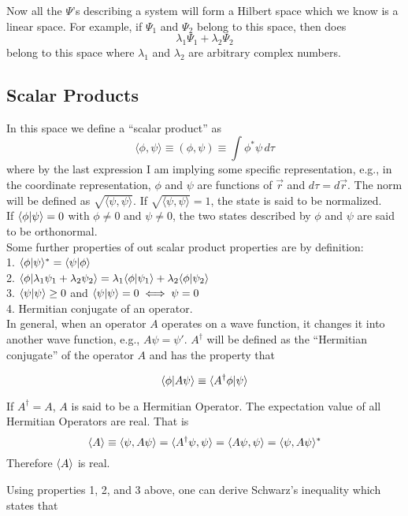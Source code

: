Now all the $\Psi$'s describing a system will form a Hilbert space which we know is a linear space. For example, if $\Psi_1$ and $\Psi_2$ belong to this space, then does $$\lambda_1\Psi_1 + \lambda_2\Psi_2$$ belong to this space where $\lambda_1$ and $\lambda_2$ are arbitrary complex numbers. 

\subsection{Scalar Products}
In this space we define a ``scalar product'' as 
$$\langle \phi,\psi\rangle  \equiv (\phi,\psi) \equiv \int \phi^*\psi\, d\tau$$ where by the last expression I am implying some specific representation, e.g., in the coordinate representation, $\phi$ and $\psi$ are functions of $\vec{r}$ and $d\tau = d\vec{r}$. The norm will be defined as $\sqrt{\langle \psi,\psi\rangle }$. If $\sqrt{\langle \psi,\psi\rangle } = 1$, the state is said to be normalized. \\
If $\langle \phi|\psi\rangle = 0$ with $\phi \ne 0$ and $\psi \ne 0$, the two states described by $\phi$ and $\psi$ are said to be orthonormal.\\
Some further properties of out scalar product properties are by definition:\\
1. $\langle \phi|\psi\rangle^* = \langle \psi|\phi\rangle$\\
2. $\langle \phi|\lambda_1 \psi_1 + \lambda_2 \psi_2\rangle = \lambda_1\langle \phi|\psi_1\rangle + \lambda_2\langle \phi|\psi_2\rangle$\\
3. $\langle \psi|\psi\rangle \ge 0$ and $\langle \psi|\psi\rangle = 0 \iff \psi = 0$\\
4. Hermitian conjugate of an operator. \\
In general, when an operator $A$ operates on a wave function, it changes it into another wave function, e.g., $A\psi = \psi'$.
$A^\dagger$ will be defined as the ``Hermitian conjugate'' of the operator $A$ and has the property that 

$$ \langle \phi|A\psi\rangle \equiv \langle A^\dagger \phi|\psi\rangle$$

If $A^\dagger = A$, $A$ is said to be a Hermitian Operator. The expectation value of all Hermitian Operators are real. That is 
$$ \langle A\rangle \equiv \langle \psi,A\psi\rangle = \langle A^\dagger\psi,\psi\rangle = \langle A\psi,\psi\rangle = \langle \psi,A\psi\rangle^*$$
Therefore $\langle A\rangle$ is real. 

Using properties 1, 2, and 3 above, one can derive Schwarz's inequality which states that 


